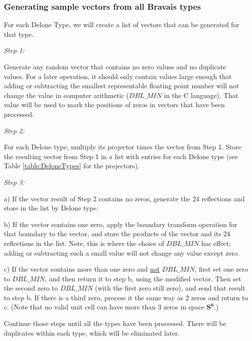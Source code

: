 \documentclass[preprint]{iucr}              %
\newcommand{\SVI}[0]{$\mathbf{S^{6}}$}
\begin{document}
	\subsubsection{Generating sample vectors from all Bravais types\protect\\}
	
	For each Delone Type, we will create a list of
	vectors that can be generated for that type.
	
	\emph{Step 1:}
	
	Generate any random vector that contains no zero 
	values and no duplicate values.  For a later operation, 
	it should only contain values large enough that adding or
	subtracting the smallest
	representable floating point number will not change the 
	value in computer arithmetic ($DBL\_MIN$ in the C language).
	That value will be used to mark the positions of zeros
	in vectors that have been processed.
	
	
	
	\emph{Step 2:}
	
	 For each Delone type, multiply its projector times 
	the vector from Step 1. Store  the resulting vector
	from Step 1 in a list 
	with entries for each Delone type (see Table \ref{table:DeloneTypes} 
	for the projectors).
	
	\emph{Step 3:}
	
	a) If the vector result of Step 2 contains no zeros, generate the 24 reflections
	and store in the list by Delone type. 
	
	
	
	b) If the vector contains one zero, apply the boundary transform 
	operation for that boundary
	to the vector, and
	store the products of the vector and its 24 reflections in the list. Note, 
	this is where the choice of $DBL\_MIN$ has effect; adding or
	subtracting such a small value will not change
	any value except zero.
	
	c) If the vector contains more than one zero and \underline{not} $DBL\_MIN$, 
	first set one zero to $DBL\_MIN$,  and then return it to 
	step b, using the modified vector. Then set the second zero to $DBL\_MIN$ (with the
	first zero still zero), and send that result to step b. 
	If there is a third zero,  process it the same way as 2 zeros and return to c.
	(Note that no valid unit cell can have more than 3 zeros
	in space \SVI{}.)
	
	Continue those steps until all the types have been processed. 
	There will be duplicates within each type,
	which will be eliminated later.
	
\end{document}
